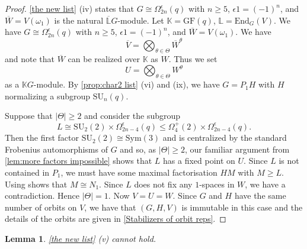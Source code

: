 \documentclass[12pt]{amsart}
\newtheorem{lemma}[theorem]{Lemma}
\theoremstyle{remark}
\theoremstyle{notation}
\theoremstyle{definition}
\newcommand{\SU}{\mathrm{SU}}
\newcommand{\GF}{\mathrm{GF}}
\newcommand{\0}{\emptyset}
\newcommand{\Sym}{\mathrm{Sym}}
\begin{document}
\begin{proof}  \cref{the new list} (iv) states that $G \cong \Omega_{2n}^\epsilon(q)$ with $n \ge 5$, $\epsilon 1= (-1)^n$,   and $\overline{W}= V(\omega_1)$ is the natural $\overline{\mathbb L}G$-module.  Let $\mathbb K= \GF(q)$, $\mathbb L=\mathrm{End}_G(V)$. We have $G \cong \Omega_{2n}^\epsilon(q)$ with $n \ge 5$, $\epsilon 1=(-1)^n$,   and  $\overline{W}=V(\omega_1)$.
We have $$\overline{V}= \bigotimes_{\theta \in \Theta} \overline W^{\theta}$$
and note that $\overline W$ can be realized over $\mathbb K$ as $W$. Thus we set
  $$U=\bigotimes_{\theta \in \Theta} W^{\theta}$$ as a $\mathbb KG$-module.
By \cref{prop:char2 list} (vi) and (ix), we have $G= P_1H$  with $H$ normalizing a subgroup $\SU_n(q)$.

Suppose that $|\Theta|\ge 2$ and consider the subgroup $$L \cong \SU_2(2) \times \Omega_{2n-4}^\epsilon(q) \le \Omega_{4}^+(2)\times \Omega_{2n-4}^\epsilon(q) .$$ Then the first factor $\SU_2(2)\cong \Sym(3)$ and is centralized by the standard Frobenius automorphisms of $G$ and  so, as $|\Theta|\ge 2$, our familiar argument from \cref{lem:more factors impossible} shows that $L$ has a fixed point on $U$. Since $L$ is not contained in $P_1$, we must have some maximal factorisation $HM$ with $M \ge L$. Using \cite[Theorem A, Tables 1 \& 2  ]{LiebeckPraegerSaxl} shows that $M \cong N_1$.  Since $L$ does not fix any $1$-spaces  in $W$,  we have a contradiction.  Hence $|\Theta|=1$.  Now $V=U=W$. Since  $G$ and $H$ have the same number of orbits on $V$, we have that $(G,H,V)$ is immutable in this case and the details of the orbits are given in \cref{Stabilizers of orbit reps}.
\end{proof}



\begin{lemma}\label{casev}    \cref{the new list} (v) cannot hold.
\end{lemma}
\end{document}
